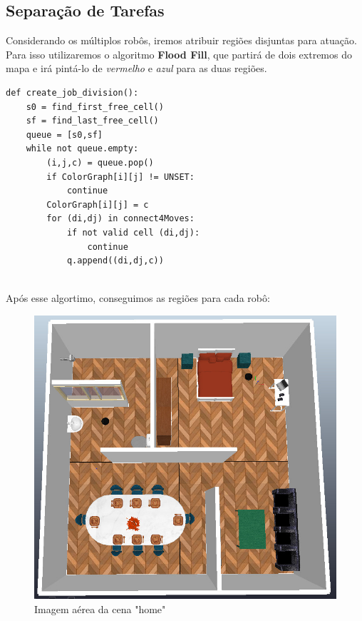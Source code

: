 \documentclass[a4paper, 10pt, conference]{ieeeconf}      %
\begin{document}
\subsection{Separação de Tarefas}
Considerando os múltiplos robôs, iremos atribuir regiões disjuntas para atuação.
Para isso utilizaremos o algoritmo \textbf{Flood Fill}, que partirá de dois extremos
do mapa e irá pintá-lo de \textit{vermelho} e \textit{azul} para as duas regiões.

\lstset{language=Python}
\begin{lstlisting}
def create_job_division():
    s0 = find_first_free_cell()
    sf = find_last_free_cell()
    queue = [s0,sf]
    while not queue.empty:
        (i,j,c) = queue.pop()
        if ColorGraph[i][j] != UNSET:
            continue
        ColorGraph[i][j] = c
        for (di,dj) in connect4Moves:
            if not valid cell (di,dj):
                continue
            q.append((di,dj,c))
        
\end{lstlisting}

Após esse algortimo, conseguimos as regiões para cada robô:

\begin{figure}[htb!]
    \centering
    \includegraphics[scale=0.2]{../home_pic.png}
    \caption{Imagem aérea da cena "home"}
\end{figure}
\end{document}
